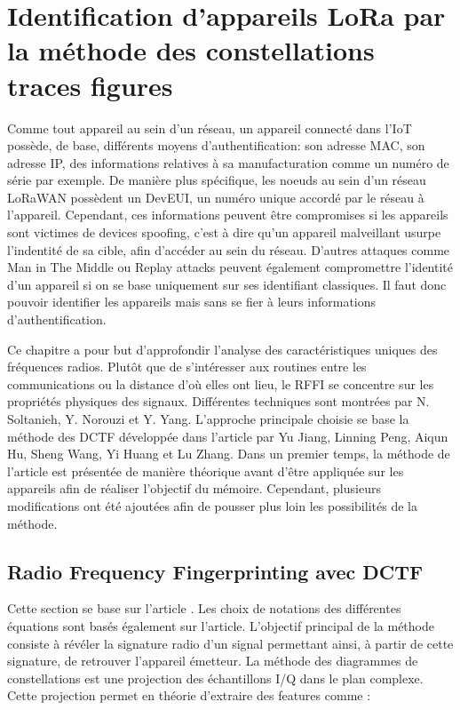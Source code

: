\renewcommand{\leftmark}{IDENTIFICATION}

\chapter{Identification d'appareils LoRa par la méthode des constellations traces figures}

Comme tout appareil au sein d'un réseau, un appareil connecté dans l'\ac{IoT} possède, de base, différents moyens d'authentification: son adresse \ac{MAC}, son adresse IP, des informations relatives à sa manufacturation comme un numéro de série par exemple. De manière plus spécifique, les noeuds au sein d'un réseau LoRaWAN possèdent un DevEUI, un numéro unique accordé par le réseau à l'appareil. Cependant, ces informations peuvent être compromises si les appareils sont victimes de devices spoofing, c'est à dire qu'un appareil malveillant usurpe l'indentité de sa cible, afin d'accéder au sein du réseau. D'autres attaques comme Man in The Middle ou Replay attacks peuvent également compromettre l'identité d'un appareil si on se base uniquement sur ses identifiant classiques\cite{attack}. Il faut donc pouvoir identifier les appareils mais sans se fier à leurs informations d'authentification.

\vspace{0.1cm}

Ce chapitre a pour but d'approfondir l'analyse des caractéristiques uniques des fréquences radios. Plutôt que de s'intéresser aux routines entre les communications ou la distance d'où elles ont lieu, le \ac{RFFI} se concentre sur les propriétés physiques des signaux. Différentes techniques sont montrées par N. Soltanieh, Y. Norouzi et Y. Yang\cite{rffi1}. L'approche principale choisie se base la méthode des \ac{DCTF} développée dans l'article \cite{loraDCTF} par Yu Jiang, Linning Peng, Aiqun Hu, Sheng Wang, Yi Huang et Lu Zhang. Dans un premier temps, la méthode de l'article est présentée de manière théorique avant d'être appliquée sur les appareils afin de réaliser l'objectif du mémoire. Cependant, plusieurs modifications ont été ajoutées afin de pousser plus loin les possibilités de la méthode.

\section{Radio Frequency Fingerprinting avec DCTF}\label{DCTF}

Cette section se base sur l'article \cite{loraDCTF}. Les choix de notations des différentes équations sont basés également sur l'article. L'objectif principal de la méthode consiste à révéler la signature radio d'un signal permettant ainsi, à partir de cette signature, de retrouver l'appareil émetteur. La méthode des diagrammes de constellations est une projection des échantillons \ac{I/Q} dans le plan complexe. Cette projection permet en théorie d'extraire des features comme :

